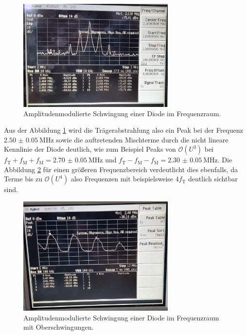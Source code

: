 \begin{figure}
  \centering
  \includegraphics[width=0.7\textwidth]{spec/frequenzbereich_klein_diode.jpg}
  \caption{Amplitudenmodulierte
Schwingung einer Diode im Frequenzraum.}
  \label{fig:diode_frequenz_klein}
\end{figure}
Aus der Abbildung \ref{fig:diode_frequenz_klein}
wird die Trägerabstrahlung also
ein Peak bei der Frequenz $\SI{2.50(5)}{\mega\hertz}$
sowie
die auftretenden Mischterme durch die nicht lineare
Kennlinie
der Diode deutlich,
wie zum Beispiel Peaks von $\mathcal{O}\left(U^3\right)$ bei $f_{\text{T}}+f_{\text{M}}+f_{\text{M}} = \SI{2.70(5)}{\mega\hertz}$
und $f_{\text{T}}-f_{\text{M}}-f_{\text{M}} = \SI{2.30(5)}{\mega\hertz}$.
Die Abbildung \ref{fig:diode_frequenz_gross}
für einen größeren Frequenzbereich
verdeutlicht dies ebenfalls, da Terme bis
zu $\mathcal{O}\left(U^4\right)$
also Frequenzen mit beispielsweise $4f_{\text{T}}$
deutlich sichtbar sind.
\begin{figure}
  \centering
  \includegraphics[width=0.7\textwidth]{spec/frequenzbereich_gross_diode.jpg}
  \caption{Amplitudenmodulierte
Schwingung einer Diode im Frequenzraum mit Oberschwingungen.}
\label{fig:diode_frequenz_gross}
\end{figure}

